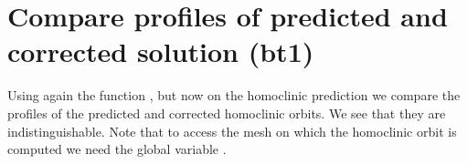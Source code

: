 \documentclass[letterpaper,10pt,english]{jupyterBook}
\begin{document}
\begin{sphinxVerbatim}[commandchars=\\\{\}]
\PYG{p}{[}\PYG{p}{]}
\PYG{p}{[}\PYG{p}{]}
\end{sphinxVerbatim}


\section{Compare profiles of predicted and corrected solution (bt1)}
\label{\detokenize{Morris-Lecar:compare-profiles-of-predicted-and-corrected-solution-bt1}}
\sphinxAtStartPar
Using again the  function , but now on the homoclinic
prediction  we compare the profiles of the predicted and corrected
homoclinic orbits. We see that they are indistinguishable. Note that to access
the mesh on which the homoclinic orbit is computed we need the global variable
.
\end{document}
